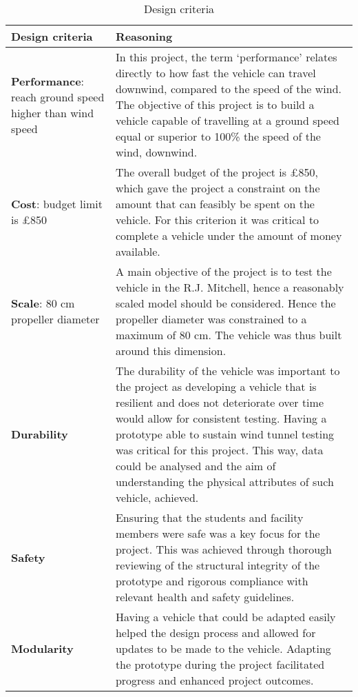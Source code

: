 \newcommand{\disregardCell}{\cellcolor[HTML]{C0C0C0}}
\begin{table}[!htbp]
\centering
\caption{Design criteria}
\label{tab:desigCrit}
\begin{tabular}{|p{3cm} |p{13.8cm}|}
\hline
\cellcolor[HTML]{\CellColor}\textbf{Design criteria}   & \cellcolor[HTML]{\CellColor}\textbf{Reasoning}
\\ \hline
\textbf{Performance}: reach ground speed higher than wind speed    
& 
In this project, the term `performance' relates directly to how fast the vehicle can travel downwind, compared to the speed of the wind. The objective of this project is to build a vehicle capable of travelling at a ground speed equal or superior to 100\% the speed of the wind, downwind.
\\ \hline
\textbf{Cost}: budget limit is \pounds850              
& 
The overall budget of the project is \pounds850, which gave the project a constraint on the amount that can feasibly be spent on the vehicle. For this criterion it was critical to complete a vehicle under the amount of money available.
\\ \hline
\textbf{Scale}: 80 cm propeller diameter       
& 
A main objective of the project is to test the vehicle in the R.J. Mitchell, hence a reasonably scaled model should be considered. Hence the propeller diameter was constrained to a maximum of 80 cm. The vehicle was thus built around this dimension. 
\\ \hline
\textbf{Durability}        
& 
The durability of the vehicle was important to the project as developing a vehicle that is resilient and does not deteriorate over time would allow for consistent testing. Having a prototype able to sustain wind tunnel testing was critical for this project. This way, data could be analysed and the aim of understanding the physical attributes of such vehicle, achieved. 
\\ \hline
\textbf{Safety}            
& 
Ensuring that the students and facility members were safe was a key focus for the project. This was achieved through thorough reviewing of the structural integrity of the prototype and rigorous compliance with relevant health and safety guidelines.
\\ \hline
\textbf{Modularity}        
& 
Having a vehicle that could be adapted easily helped the design process and allowed for updates to be made to the vehicle. Adapting the prototype during the project facilitated progress and enhanced project outcomes.
\\ \hline
\end{tabular}
\end{table}